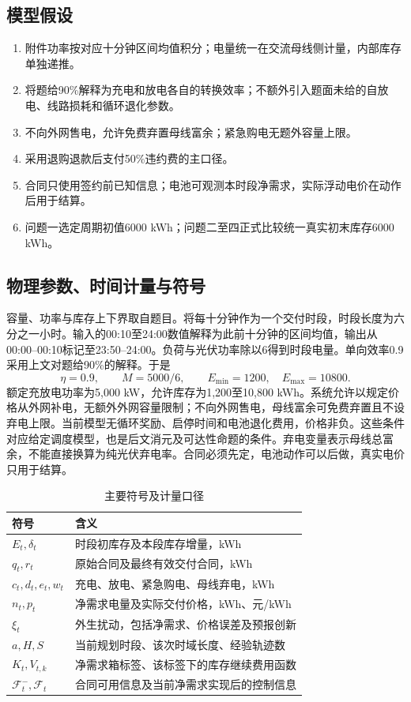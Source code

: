 \documentclass[UTF8,a4paper,zihao=-4,fontset=mac]{ctexart}
\begin{document}
\subsection{模型假设}
\begin{enumerate}
\item 附件功率按对应十分钟区间均值积分；电量统一在交流母线侧计量，内部库存单独递推。
\item 将题给90\%解释为充电和放电各自的转换效率；不额外引入题面未给的自放电、线路损耗和循环退化参数。
\item 不向外网售电，允许免费弃置母线富余；紧急购电无题外容量上限。
\item 采用退购退款后支付50\%违约费的主口径。
\item 合同只使用签约前已知信息；电池可观测本时段净需求，实际浮动电价在动作后用于结算。
\item 问题一选定周期初值6000 kWh；问题二至四正式比较统一真实初末库存6000 kWh。
\end{enumerate}
\subsection{物理参数、时间计量与符号}
容量、功率与库存上下界取自题目。将每十分钟作为一个交付时段，时段长度为六分之一小时。输入的00:10至24:00数值解释为此前十分钟的区间均值，输出从00:00--00:10标记至23:50--24:00。负荷与光伏功率除以6得到时段电量。单向效率0.9采用上文对题给90\%的解释。于是
\begin{equation}
 \eta=0.9,\qquad M=5000/6,\qquad E_{\min}=1200,\quad E_{\max}=10800.
\end{equation}
额定充放电功率为5,000 kW，允许库存为1,200至10,800 kWh。系统允许以规定价格从外网补电，无额外外网容量限制；不向外网售电，母线富余可免费弃置且不设弃电上限。当前模型无循环奖励、启停时间和电池退化费用，价格非负。这些条件对应给定调度模型，也是后文消元及可达性命题的条件。弃电变量表示母线总富余，不能直接换算为纯光伏弃电率。合同必须先定，电池动作可以后做，真实电价只用于结算。

\begin{table}[H]\centering\small
\caption{主要符号及计量口径}
\begin{tabular}{lp{10.2cm}}\toprule
符号 & 含义 \\ \midrule
$E_t,\delta_t$ & 时段初库存及本段库存增量，kWh \\
$q_t,r_t$ & 原始合同及最终有效交付合同，kWh \\
$c_t,d_t,e_t,w_t$ & 充电、放电、紧急购电、母线弃电，kWh \\
$n_t,p_t$ & 净需求电量及实际交付价格，kWh、元/kWh \\
$\xi_t$ & 外生扰动，包括净需求、价格误差及预报创新 \\
$a,H,S$ & 当前规划时段、该次时域长度、经验轨迹数 \\
$K_t,V_{t,k}$ & 净需求箱标签、该标签下的库存继续费用函数 \\
$\mathcal F_t^-,\mathcal F_t$ & 合同可用信息及当前净需求实现后的控制信息 \\
\bottomrule\end{tabular}\end{table}
\end{document}
